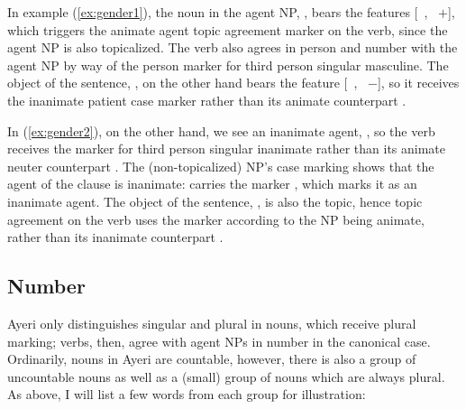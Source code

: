 In example (\ref{ex:gender1}), the noun in the agent NP,
, bears the features [\Gend{}~\M{}, \Anim{}~$+$],
which triggers the animate agent topic agreement marker  on the
verb, since the agent NP is also topicalized. The verb also agrees in person
and number with the agent NP by way of the person marker  for
third person singular masculine. The object of the sentence,
, on the other hand bears the feature
[\Gend{}~\Inan{}, \Anim{}~$-$], so it receives the inanimate patient case
marker  rather than its animate counterpart .

In (\ref{ex:gender2}), on the other hand, we see an inanimate agent,
, so the verb receives the marker  
for third person singular inanimate rather than its animate neuter counterpart
. The (non-topicalized) NP's case marking shows that the agent 
of the clause is inanimate:  carries the marker
, which marks it as an inanimate agent. The object of the 
sentence, , is also the topic, hence topic
agreement on the verb uses the marker  according to the NP being
animate, rather than its inanimate counterpart .


\subsection{Number}

Ayeri only distinguishes singular and plural in nouns, which receive plural 
marking; verbs, then, agree with agent NPs in number in the canonical case. 
Ordinarily, nouns in Ayeri are countable, however, there is also a group of 
uncountable nouns as well as a (small) group of nouns which are always plural. 
As above, I will list a few words from each group for illustration:

